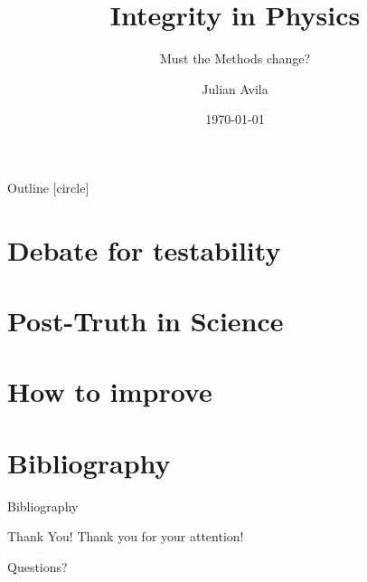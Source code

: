 \documentclass[sn-mathphys-num]{beamer}
\title{Integrity in Physics}
\subtitle{Must the Methods change?}
\author{Julian Avila}
\institute{Universidad Distrital Francisco José de Caldas}
\date{\today}
\begin{document}
\begin{frame}
	\titlepage
\end{frame}

\begin{frame}{Outline}
	[circle]
	\tableofcontents
\end{frame}

\section{Debate for testability}


\section{Post-Truth in Science}


\section{How to improve}


\section{Bibliography}
\begin{frame}[allowframebreaks]{Bibliography}
	\footnotesize
	\printbibliography
	\nocite{*}
\end{frame}

\begin{frame}{Thank You!}
	\centering
	{\LARGE Thank you for your attention!}
	\vspace{0.5cm}

	\Large Questions?
\end{frame}
\end{document}
